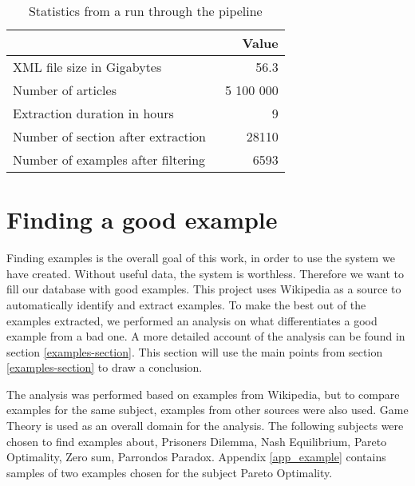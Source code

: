 \begin{table}[h!]
\centering
\begin{tabular} {|| p{15em} | r ||} 
 \hline
  & Value \\ [0.5ex] 
 \hline
XML file size in Gigabytes & 56.3 \\
Number of articles & ~5 100 000 \\
Extraction duration in hours & ~9 \\
Number of section after extraction & 28110 \\
Number of examples after filtering & 6593 \\

 \hline
\end{tabular}
\caption{Statistics from a run through the pipeline}
\label{table:run_statistics}
\end{table}


\section{Finding a good example}
Finding examples is the overall goal of this work, in order to use the system we have created. Without useful data, the system is worthless. Therefore we want to fill our database with good examples. This project uses Wikipedia as a source to automatically identify and extract examples. To make the best out of the examples extracted, we performed an analysis on what differentiates a good example from a bad one. A more detailed account of the analysis can be found in section \ref{examples-section}. This section will use the main points from section \ref{examples-section} to draw a conclusion.

The analysis was performed based on examples from Wikipedia, but to compare examples for the same subject, examples from other sources were also used. Game Theory is used as an overall domain for the analysis. The following subjects were chosen to find examples about, Prisoners Dilemma, Nash Equilibrium, Pareto Optimality, Zero sum, Parrondos Paradox. Appendix \ref{app_example} contains samples of two examples chosen for the subject Pareto Optimality. 

